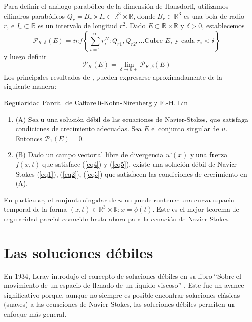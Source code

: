 Para definir el análogo parabólico de la dimensión de Hausdorff, utilizamos cilindros parabólicos $Q_r = B_r \times I_r \subset \mathbb{R}^3 \times \mathbb{R}$, donde $B_r \subset \mathbb{R}^3$ es una bola de radio $r$, e $I_r \subset \mathbb{R}$ es un intervalo de longitud $r^2$. Dado $E \subset \mathbb{R} \times \mathbb{R}$ y $\delta  > 0$, establecemos
\begin{equation*}
    \mathcal{P}_{K,\delta}(E) = inf \left\{ \sum_{i = 1}^{\infty} r_{i}^{K}:Q_{r1},Q_{r2},\dots\text{Cubre }E, \text{ y cada }r_i<\delta \right\} 
\end{equation*}
y luego definir
\begin{equation*}
    \mathcal{P}_K(E) = \lim_{\delta \to 0+} \mathcal{P}_{K,\delta}(E)
\end{equation*}
Los principales resultados de \cite{caffarelli1982partial}, \cite{lin1998new} pueden expresarse aproximadamente de la siguiente manera:
\begin{theorem}
    Regularidad Parcial de Caffarelli-Kohn-Nirenberg y F.-H. Lin
    \begin{enumerate}
        \item (A) Sea u una solución débil de las ecuaciones de Navier-Stokes, que satisfaga condiciones de crecimiento adecuadas. Sea $E$ el conjunto singular de $u$. Entonces $\mathcal{P}_1(E)=0$.
        \item (B) Dado un campo vectorial libre de divergencia $u^{\circ}(x)$ y una fuerza $f(x, t)$ que satisface (\ref{eq4}) y (\ref{eq5}), existe una solución débil de Navier-Stokes (\ref{eq1}), (\ref{eq2}), (\ref{eq3}) que satisfacen las condiciones de crecimiento en (A).
    \end{enumerate}
\end{theorem}
En particular, el conjunto singular de $u$ no puede contener una curva espacio-temporal de la forma ${(x, t) \in \mathbb{R}^3 \times \mathbb{R}: x = \phi (t)}$. Este es el mejor teorema de regularidad parcial conocido hasta ahora para la ecuación de Navier-Stokes.







\section{Las soluciones débiles}
En 1934, Leray introdujo el concepto de soluciones débiles en su libro ``Sobre el movimiento de un espacio de llenado de un líquido viscoso'' \cite{leray1934mouvement}. Este fue un avance significativo porque, aunque no siempre es posible encontrar soluciones clásicas (suaves) a las ecuaciones de Navier-Stokes, las soluciones débiles permiten un enfoque más general.

